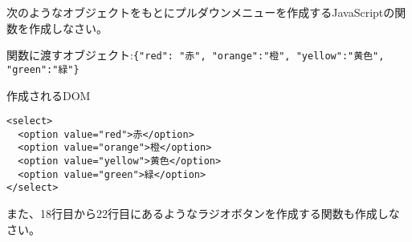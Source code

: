 \begin{Prob}\upshape\Must
次のようなオブジェクトをもとにプルダウンメニューを作成するJavaScriptの関
 数を作成しなさい。

関数に渡すオブジェクト:\Verb+{"red": "赤", "orange":"橙", "yellow":"黄色", "green":"緑"}+

作成されるDOM
\begin{Verbatim}
<select>
  <option value="red">赤</option>
  <option value="orange">橙</option>
  <option value="yellow">黄色</option>
  <option value="green">緑</option>
</select>
\end{Verbatim}
 また、18行目から22行目にあるようなラジオボタンを作成する関数も作成しな
 さい。
\end{Prob}
